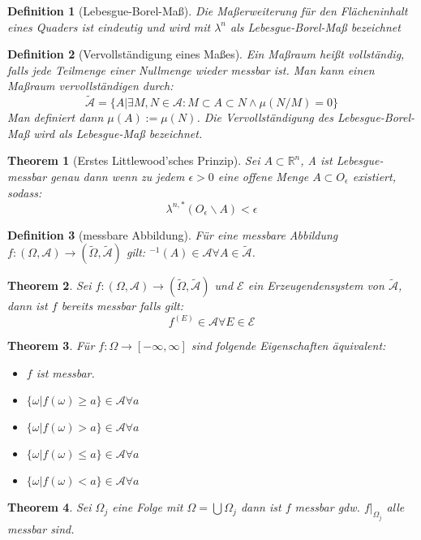 \documentclass[10pt,a4paper]{article}
\newtheorem{theorem}{Theorem}
\newtheorem{definition}{Definition}
\begin{document}
\begin{definition}[Lebesgue-Borel-Maß]
	Die Maßerweiterung für den Flächeninhalt eines Quaders ist eindeutig und wird mit $\lambda^n$ als Lebesgue-Borel-Maß bezeichnet
\end{definition}
\begin{definition}[Vervollständigung eines Maßes]
	Ein Maßraum heißt vollständig, falls jede Teilmenge einer Nullmenge wieder messbar ist. Man kann einen Maßraum vervollständigen durch:
	$$\tilde{\mathcal{A}} = \{A| \exists M, N \in \mathcal{A}: M\subset A \subset N \land \mu(N/M) = 0\}$$
	Man definiert dann $\mu(A) := \mu(N)$. Die Vervollständigung des Lebesgue-Borel-Maß wird als Lebesgue-Maß bezeichnet.
\end{definition}
\begin{theorem}[Erstes Littlewood'sches Prinzip]
	Sei $A \subset \mathbb{R}^n$, A ist Lebesgue-messbar genau dann wenn zu jedem $\epsilon > 0$ eine offene Menge $A \subset O_\epsilon$ existiert, sodass:
	$$\lambda^{n, *} (O_\epsilon\backslash A) < \epsilon$$
\end{theorem}
\begin{definition}[messbare Abbildung]
	Für eine messbare Abbildung $f: (\Omega, \mathcal{A}) \to (\tilde{\Omega}, \tilde{\mathcal{A}})$ gilt: $^{-1}(A) \in \mathcal{A} \forall A \in \tilde{\mathcal{A}}$.
\end{definition}
\begin{theorem}
	Sei $f: (\Omega, \mathcal{A}) \to (\tilde{\Omega}, \tilde{\mathcal{A}})$ und $\mathcal{E}$ ein Erzeugendensystem von $\tilde{\mathcal{A}}$, dann ist $f$ bereits messbar falls gilt:
	$$f^(E) \in \mathcal{A} \forall E \in \mathcal{E}$$
\end{theorem}
\begin{theorem}
	Für $f: \Omega \to [-\infty, \infty]$ sind folgende Eigenschaften äquivalent:
	\begin{itemize}
		\item $f$ ist messbar.
		\item $\{\omega | f(\omega) \geq a\}\in\mathcal{A}\forall a$
		\item $\{\omega | f(\omega) > a\}\in\mathcal{A}\forall a$
		\item $\{\omega | f(\omega) \leq a\}\in\mathcal{A}\forall a$
		\item $\{\omega | f(\omega) < a\}\in\mathcal{A}\forall a$
	\end{itemize}
\end{theorem}
\begin{theorem}
	Sei $\Omega_j$ eine Folge mit $\Omega = \bigcup\Omega_j$ dann ist $f$ messbar gdw. $f|_{\Omega_j}$ alle messbar sind.	
\end{theorem}
\end{document}
